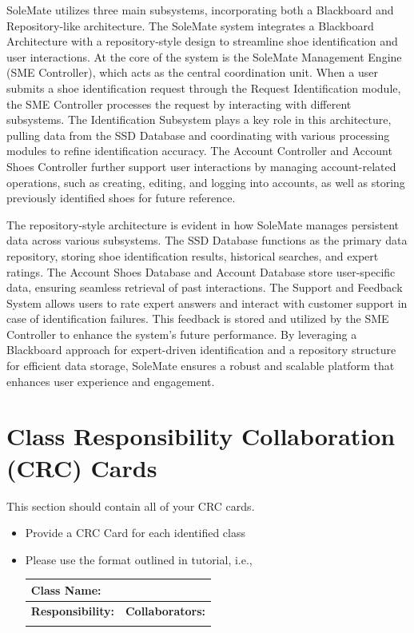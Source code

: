\documentclass[]{article}
\begin{document}
SoleMate utilizes three main subsystems, incorporating both a Blackboard and Repository-like architecture. The SoleMate system integrates a Blackboard Architecture with a repository-style design to streamline shoe identification and user interactions. At the core of the system is the SoleMate Management Engine (SME Controller), which acts as the central coordination unit. When a user submits a shoe identification request through the Request Identification module, the SME Controller processes the request by interacting with different subsystems. The Identification Subsystem plays a key role in this architecture, pulling data from the SSD Database and coordinating with various processing modules to refine identification accuracy. The Account Controller and Account Shoes Controller further support user interactions by managing account-related operations, such as creating, editing, and logging into accounts, as well as storing previously identified shoes for future reference.\par
The repository-style architecture is evident in how SoleMate manages persistent data across various subsystems. The SSD Database functions as the primary data repository, storing shoe identification results, historical searches, and expert ratings. The Account Shoes Database and Account Database store user-specific data, ensuring seamless retrieval of past interactions. The Support and Feedback System allows users to rate expert answers and interact with customer support in case of identification failures. This feedback is stored and utilized by the SME Controller to enhance the system’s future performance. By leveraging a Blackboard approach for expert-driven identification and a repository structure for efficient data storage, SoleMate ensures a robust and scalable platform that enhances user experience and engagement.


	
\section{Class Responsibility Collaboration (CRC) Cards}
\label{sec:class_responsibility_collaboration_crc_cards}
This section should contain all of your CRC cards.

\begin{itemize}
	\item Provide a CRC Card for each identified class
	\item Please use the format outlined in tutorial, i.e., 
	\begin{table}[ht]
		\centering
		\begin{tabular}{|p{5cm}|p{5cm}|}
		\hline 
		 \multicolumn{2}{|l|}{\textbf{Class Name:}} \\
		\hline
		\textbf{Responsibility:} & \textbf{Collaborators:} \\
		\hline
		\vspace{1in} & \\
		\hline
		\end{tabular}
	\end{table}
	
\end{itemize}
\end{document}
